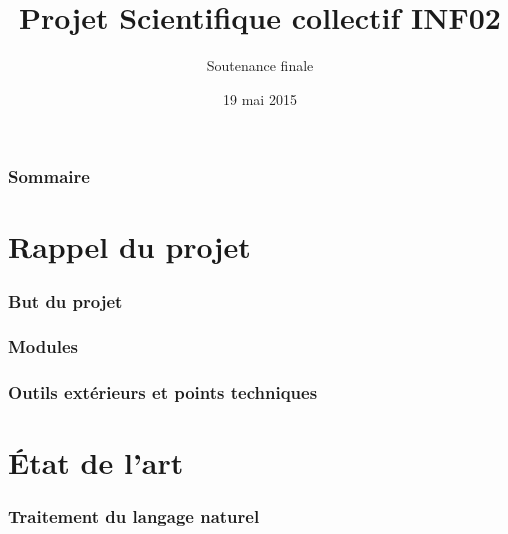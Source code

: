 \documentclass[12pt, handout]{beamer}
\title{Projet Scientifique collectif INF02}
\subtitle{Soutenance finale}
\author{}
\date{19 mai 2015}
\begin{document}

    \begin{frame}
      \maketitle
    \end{frame}		


    \begin{frame}
      \frametitle{Sommaire}
      \tableofcontents
    \end{frame}

\section{Rappel du projet}

\begin{frame}
 \frametitle{But du projet}
 

\end{frame}

\begin{frame}
 \frametitle{Modules}
 
 
\end{frame}


\begin{frame}
 \frametitle{Outils extérieurs et points techniques}
 
 
\end{frame}

\section{État de l'art}

\begin{frame}
 \frametitle{Traitement du langage naturel}
 
 
\end{frame}
\end{document}
